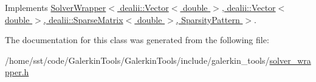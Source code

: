 Implements \hyperlink{class_solver_wrapper_a75a599630086e2edee14eb43ae071733}{Solver\+Wrapper$<$ dealii\+::\+Vector$<$ double $>$, dealii\+::\+Vector$<$ double $>$, dealii\+::\+Sparse\+Matrix$<$ double $>$, Sparsity\+Pattern $>$}.



The documentation for this class was generated from the following file\+:\begin{DoxyCompactItemize}
\item 
/home/sst/code/\+Galerkin\+Tools/\+Galerkin\+Tools/include/galerkin\+\_\+tools/\hyperlink{solver__wrapper_8h}{solver\+\_\+wrapper.\+h}\end{DoxyCompactItemize}
